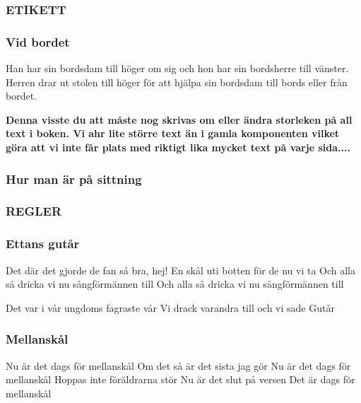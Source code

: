 \newpage

\subsubsection*{ETIKETT}

\subsubsection*{Vid bordet}
Han har sin bordsdam till höger om sig och hon har sin bordsherre till vänster.
Herren drar ut stolen till höger för att hjälpa sin bordsdam till bords eller från bordet. 


\textbf{Denna visste du att måste nog skrivas om eller ändra storleken på all text i boken. Vi ahr lite större text än i gamla komponenten vilket göra att vi inte får plats med riktigt lika mycket text på varje sida....}


\newpage

\subsubsection*{Hur man är på sittning}
\subsubsection*{REGLER}
\subsubsection*{Ettans gutår}

Det där det gjorde de fan så bra, hej!
En skål uti botten för de nu vi ta
Och alla så dricka vi nu sångförmännen till 
Och alla så dricka vi nu sångförmännen till

Det var i vår ungdoms fagraste vår
Vi drack varandra till och vi sade Gutår

\subsubsection*{Mellanskål}

Nu är det dags för mellanskål
Om det så är det sista jag gör
Nu är det dags för mellanskål
Hoppas inte föräldrarna stör
Nu är det slut på versen 
Det är dags för mellanskål


